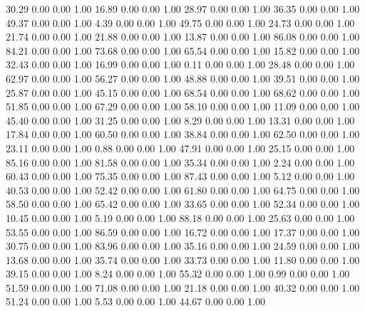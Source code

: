    30.29   0.00   0.00   1.00
   16.89   0.00   0.00   1.00
   28.97   0.00   0.00   1.00
   36.35   0.00   0.00   1.00
   49.37   0.00   0.00   1.00
    4.39   0.00   0.00   1.00
   49.75   0.00   0.00   1.00
   24.73   0.00   0.00   1.00
   21.74   0.00   0.00   1.00
   21.88   0.00   0.00   1.00
   13.87   0.00   0.00   1.00
   86.08   0.00   0.00   1.00
   84.21   0.00   0.00   1.00
   73.68   0.00   0.00   1.00
   65.54   0.00   0.00   1.00
   15.82   0.00   0.00   1.00
   32.43   0.00   0.00   1.00
   16.99   0.00   0.00   1.00
    0.11   0.00   0.00   1.00
   28.48   0.00   0.00   1.00
   62.97   0.00   0.00   1.00
   56.27   0.00   0.00   1.00
   48.88   0.00   0.00   1.00
   39.51   0.00   0.00   1.00
   25.87   0.00   0.00   1.00
   45.15   0.00   0.00   1.00
   68.54   0.00   0.00   1.00
   68.62   0.00   0.00   1.00
   51.85   0.00   0.00   1.00
   67.29   0.00   0.00   1.00
   58.10   0.00   0.00   1.00
   11.09   0.00   0.00   1.00
   45.40   0.00   0.00   1.00
   31.25   0.00   0.00   1.00
    8.29   0.00   0.00   1.00
   13.31   0.00   0.00   1.00
   17.84   0.00   0.00   1.00
   60.50   0.00   0.00   1.00
   38.84   0.00   0.00   1.00
   62.50   0.00   0.00   1.00
   23.11   0.00   0.00   1.00
    0.88   0.00   0.00   1.00
   47.91   0.00   0.00   1.00
   25.15   0.00   0.00   1.00
   85.16   0.00   0.00   1.00
   81.58   0.00   0.00   1.00
   35.34   0.00   0.00   1.00
    2.24   0.00   0.00   1.00
   60.43   0.00   0.00   1.00
   75.35   0.00   0.00   1.00
   87.43   0.00   0.00   1.00
    5.12   0.00   0.00   1.00
   40.53   0.00   0.00   1.00
   52.42   0.00   0.00   1.00
   61.80   0.00   0.00   1.00
   64.75   0.00   0.00   1.00
   58.50   0.00   0.00   1.00
   65.42   0.00   0.00   1.00
   33.65   0.00   0.00   1.00
   52.34   0.00   0.00   1.00
   10.45   0.00   0.00   1.00
    5.19   0.00   0.00   1.00
   88.18   0.00   0.00   1.00
   25.63   0.00   0.00   1.00
   53.55   0.00   0.00   1.00
   86.59   0.00   0.00   1.00
   16.72   0.00   0.00   1.00
   17.37   0.00   0.00   1.00
   30.75   0.00   0.00   1.00
   83.96   0.00   0.00   1.00
   35.16   0.00   0.00   1.00
   24.59   0.00   0.00   1.00
   13.68   0.00   0.00   1.00
   35.74   0.00   0.00   1.00
   33.73   0.00   0.00   1.00
   11.80   0.00   0.00   1.00
   39.15   0.00   0.00   1.00
    8.24   0.00   0.00   1.00
   55.32   0.00   0.00   1.00
    0.99   0.00   0.00   1.00
   51.59   0.00   0.00   1.00
   71.08   0.00   0.00   1.00
   21.18   0.00   0.00   1.00
   40.32   0.00   0.00   1.00
   51.24   0.00   0.00   1.00
    5.53   0.00   0.00   1.00
   44.67   0.00   0.00   1.00
